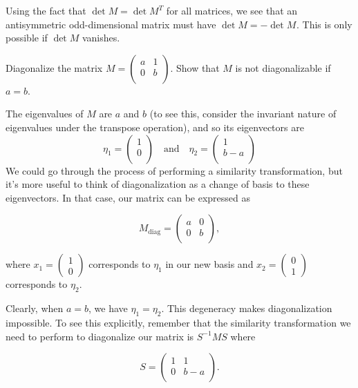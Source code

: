 \documentclass[../group-theory-in-a-nutshell-for-physicists.tex]{subfiles}
\begin{document}
\begin{questions}
\begin{solution}
Using the fact that $\det M = \det M^{T}$ for all matrices, we see
that an antisymmetric odd-dimensional matrix must have
$\det M = {- \det M}^{}$. This is only possible if $\det M$
vanishes.
\end{solution}

\question Diagonalize the matrix $M = \begin{pmatrix}
a & 1 \\
0 & b \\
\end{pmatrix}$. Show that $M$ is not diagonalizable if $a=b$.

\begin{solution}
The eigenvalues of $M$ are $a$ and $b$ (to see this, consider the invariant nature of eigenvalues under the transpose operation), and so its eigenvectors are 
\[
\eta_{1} = \begin{pmatrix}
1 \\
0 \\
\end{pmatrix} \quad \text{and} \quad \eta_{2} = \begin{pmatrix}
1 \\
b - a \\
\end{pmatrix}
\]
We could go through the process of
performing a similarity transformation, but it's more useful to think of
diagonalization as a change of basis to these eigenvectors. In that case, our
matrix can be expressed as

\[M_{\text{diag}} = \begin{pmatrix}
a & 0 \\
0 & b \\
\end{pmatrix},
\]

where $x_{1} = \begin{pmatrix}
1 \\
0
\end{pmatrix}$ corresponds to $\eta_{1}$ in our new basis and
$x_{2} = \begin{pmatrix}
0 \\
1
\end{pmatrix}$ corresponds to $\eta_{2}$.

Clearly, when $a = b$, we have $\eta_{1} = \eta_{2}$. This
degeneracy makes diagonalization impossible. To see this explicitly,
remember that the similarity transformation we need to perform to
diagonalize our matrix is $S^{- 1}MS$ where

\[
S = \begin{pmatrix}
1 & 1 \\
0 & b - a \\
\end{pmatrix}.
\]


\end{solution}
\end{questions}
\end{document}
